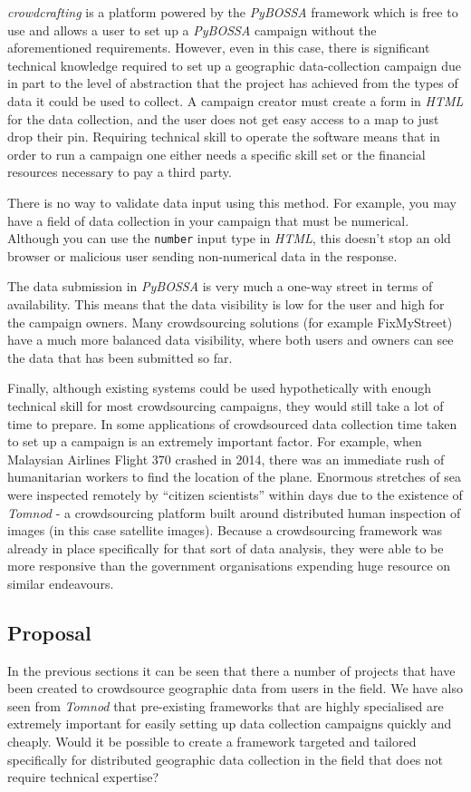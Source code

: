 \documentclass{article}
\begin{document}
		\emph{crowdcrafting}\cite{_crowdcrafting_????} is a platform powered by the \emph{PyBOSSA} framework which is free to use and allows a user to set up a \emph{PyBOSSA} campaign without the aforementioned requirements. However, even in this case, there is significant technical knowledge required to set up a geographic data-collection campaign due in part to the level of abstraction that the project has achieved from the types of data it could be used to collect. A campaign creator must create a form in \emph{HTML} for the data collection, and the user does not get easy access to a map to just drop their pin. Requiring technical skill to operate the software means that in order to run a campaign one either needs a specific skill set or the financial resources necessary to pay a third party.

		There is no way to validate data input using this method. For example, you may have a field of data collection in your campaign that must be numerical. Although you can use the \texttt{number} input type in \emph{HTML}, this doesn't stop an old browser or malicious user sending non-numerical data in the response.

		The data submission in \emph{PyBOSSA} is very much a one-way street in terms of availability. This means that the data visibility is low for the user and high for the campaign owners. Many crowdsourcing solutions (for example FixMyStreet) have a much more balanced data visibility, where both users and owners can see the data that has been submitted so far.

		Finally, although existing systems could be used hypothetically with enough technical skill for most crowdsourcing campaigns, they would still take a lot of time to prepare. In some applications of crowdsourced data collection time taken to set up a campaign is an extremely important factor. For example, when Malaysian Airlines Flight 370 crashed in 2014, there was an immediate rush of humanitarian workers to find the location of the plane. Enormous stretches of sea were inspected remotely by ``citizen scientists'' within days due to the existence of \emph{Tomnod} - a crowdsourcing platform built around distributed human inspection of images (in this case satellite images)\cite{_missing_2014}. Because a crowdsourcing framework was already in place specifically for that sort of data analysis, they were able to be more responsive than the government organisations expending huge resource on similar endeavours.

		\subsection{Proposal}
		In the previous sections it can be seen that there a number of projects that have been created to crowdsource geographic data from users in the field. We have also seen from \emph{Tomnod} that pre-existing frameworks that are highly specialised are extremely important for easily setting up data collection campaigns quickly and cheaply. Would it be possible to create a framework targeted and tailored specifically for distributed geographic data collection in the field that does not require technical expertise?
\end{document}

